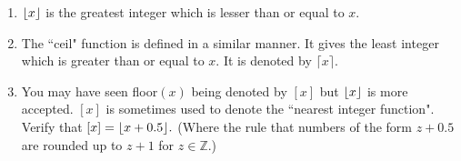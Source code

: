 \newpage
\begin{enumerate}
    \item $\lfloor x \rfloor$ is the greatest integer which is lesser than or equal to $x$.
    \item The ``ceil" function is defined in a similar manner. It gives the least integer which is greater than or equal to $x$. It is denoted by $\lceil x \rceil$.
    \item You may have seen floor$(x)$ being denoted by $[x]$ but $\lfloor x \rfloor$ is more accepted. $[x]$ is sometimes used to denote the ``nearest integer function". Verify that $[x] = \lfloor x + 0.5 \rfloor.$ (Where the rule that numbers of the form $z + 0.5$ are rounded up to $z+1$ for $z \in \mathbb{Z}$.) 
\end{enumerate}